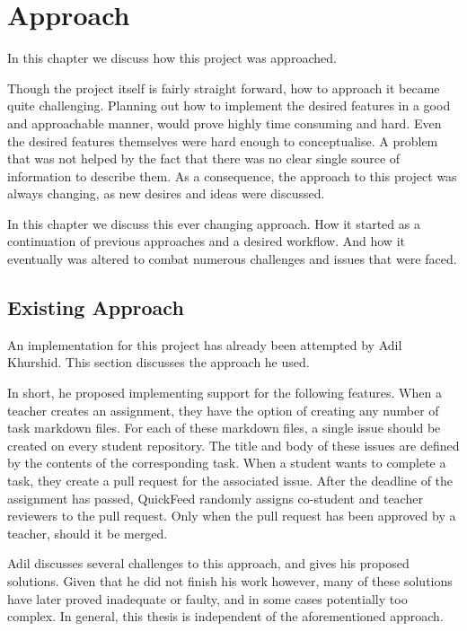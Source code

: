 
\chapter{Approach}
\label{ch:approach}
In this chapter we discuss how this project was approached.

Though the project itself is fairly straight forward, how to approach it became quite challenging.
Planning out how to implement the desired features in a good and approachable manner, would prove highly time consuming and hard.
Even the desired features themselves were hard enough to conceptualise.
A problem that was not helped by the fact that there was no clear single source of information to describe them.
As a consequence, the approach to this project was always changing, as new desires and ideas were discussed.

In this chapter we discuss this ever changing approach.
How it started as a continuation of previous approaches and a desired workflow.
And how it eventually was altered to combat numerous challenges and issues that were faced.
 
\section{Existing Approach}
An implementation for this project has already been attempted by Adil Khurshid. %
This section discusses the approach he used.

In short, he proposed implementing support for the following features.
When a teacher creates an assignment, they have the option of creating any number of task markdown files.
For each of these markdown files, a single issue should be created on every student repository.
The title and body of these issues are defined by the contents of the corresponding task.
When a student wants to complete a task, they create a pull request for the associated issue.
After the deadline of the assignment has passed, QuickFeed randomly assigns co-student and teacher reviewers to the pull request. 
Only when the pull request has been approved by a teacher, should it be merged.

Adil discusses several challenges to this approach, and gives his proposed solutions.
Given that he did not finish his work however, many of these solutions have later proved inadequate or faulty, and in some cases potentially too complex.
In general, this thesis is independent of the aforementioned approach.

